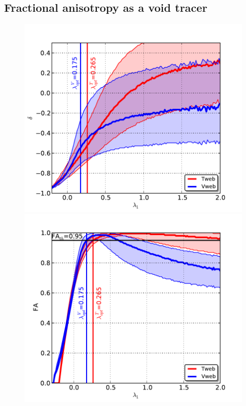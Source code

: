 \documentclass[a4,useAMS,usenatbib,usegraphicx]{mn2e}
\begin{document}
\subsection{Fractional anisotropy as a void tracer}
\label{subsec:web_voids}


\begin{figure}
\centering

  \includegraphics[trim = 2mm 2mm 5mm 10mm, clip, keepaspectratio=true,
  width=0.35\textheight]{delta_L1.pdf}  
  \includegraphics[trim = 2mm 2mm 5mm 10mm, clip, keepaspectratio=true,
  width=0.35\textheight]{FA_L1.pdf}


\end{figure}
\end{document}
